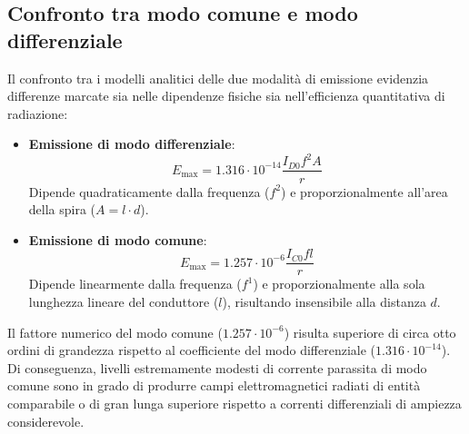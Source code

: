 \subsection{Confronto tra modo comune e modo differenziale}
Il confronto tra i modelli analitici delle due modalità di emissione evidenzia differenze marcate sia nelle dipendenze fisiche sia nell'efficienza quantitativa di radiazione:
\begin{itemize}
    \item \textbf{Emissione di modo differenziale}:
    \[
    E_{\text{max}} = 1.316 \cdot 10^{-14} \frac{I_{D0} f^2 A}{r}
    \]
    Dipende quadraticamente dalla frequenza ($f^2$) e proporzionalmente all'area della spira ($A = l \cdot d$).
    \item \textbf{Emissione di modo comune}:
    \[
    E_{\text{max}} = 1.257 \cdot 10^{-6} \frac{I_{C0} f l}{r}
    \]
    Dipende linearmente dalla frequenza ($f^1$) e proporzionalmente alla sola lunghezza lineare del conduttore ($l$), risultando insensibile alla distanza $d$.
\end{itemize}

Il fattore numerico del modo comune ($1.257 \cdot 10^{-6}$) risulta superiore di circa otto ordini di grandezza rispetto al coefficiente del modo differenziale ($1.316 \cdot 10^{-14}$). Di conseguenza, livelli estremamente modesti di corrente parassita di modo comune sono in grado di produrre campi elettromagnetici radiati di entità comparabile o di gran lunga superiore rispetto a correnti differenziali di ampiezza considerevole.

